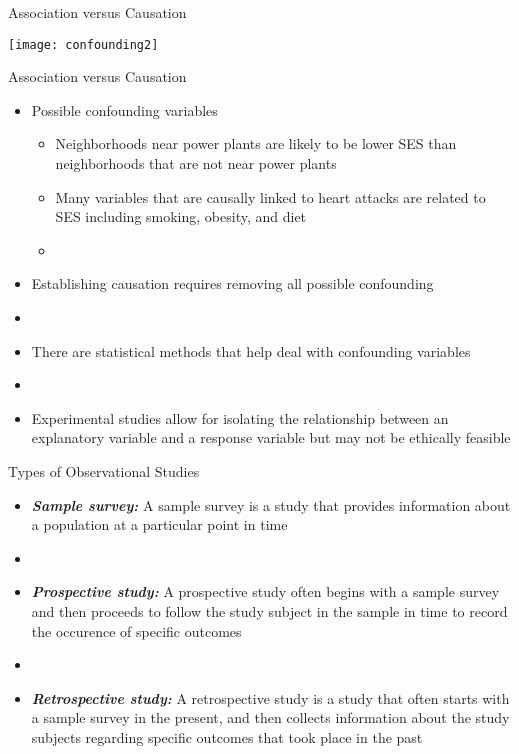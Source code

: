 \documentclass[xcolor=dvipsnames]{beamer}
\begin{document}
\begin{frame}{Association versus Causation}
	\begin{center}
		\texttt{[image: confounding2]}
	\end{center}
\end{frame}

\begin{frame}{Association versus Causation}
	\begin{itemize}
		\item Possible confounding variables
		\begin{itemize}
			\item Neighborhoods near power plants are likely to be lower SES than neighborhoods that are not near power plants
			\item Many variables that are causally linked to heart attacks are related to SES including smoking, obesity, and diet
			\item[]
		\end{itemize}
		\item Establishing causation requires removing all possible confounding 
		\item[]
		\item There are statistical methods that help deal with confounding variables
		\item[]
		\item Experimental studies allow for isolating the relationship between an explanatory variable and a response variable but may not be ethically feasible 
	\end{itemize}
\end{frame}

\begin{frame}{Types of Observational Studies}
	\begin{itemize}
		\item \textbf{\emph{Sample survey:}} A sample survey is a study that provides information about a population at a particular point in time
		\item[]
		\item \textbf{\emph{Prospective study:}} A prospective study often begins with a sample survey and then proceeds to follow the study subject in the sample in time to record the occurence of specific outcomes
		\item[]
		\item \textbf{\emph{Retrospective study:}} A retrospective study is a study that often starts with a sample survey in the present, and then collects information about the study subjects regarding specific outcomes that took place in the past
	\end{itemize}
\end{frame}
\end{document}
